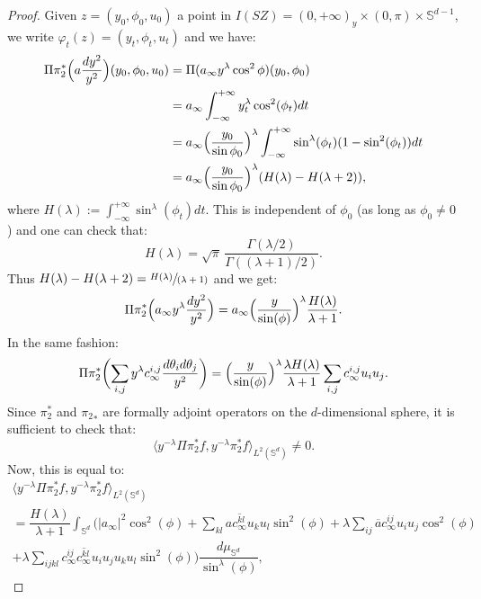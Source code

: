 \documentclass[JEP,XML,SOM,Unicode,NoFloatCountersInSection]{cedram}
\newcommand{\spfrac}[2]{\sfrac{#1}{(#2)}}
\newcommand{\Ss}{\mathbb{S}}
\theoremstyle{plain}
\theoremstyle{definition}
\begin{document}
\begin{proof}
Given $z=(y_0,\phi_0,u_0)$ a point in $I(SZ) = (0,+\infty)_y \times (0,\pi) \times \Ss^{d-1}$, we write $\varphi_t(z)=(y_t,\phi_t,u_t)$ and we have:
\[
\begin{split}
\Pi \pi^*_2 \Bigl(a \dfrac{dy^2}{y^2}\Bigr)(y_0,\phi_0,u_0) & = \Pi(a_\infty y^\lambda \cos^2 \phi)(y_0,\phi_0) \\
& = a_\infty \int_{-\infty}^{+\infty} y_t^\lambda \cos^2(\phi_t) dt \\
& = a_\infty \Bigl(\dfrac{y_0}{\sin \phi_0}\Bigr)^\lambda \int_{-\infty}^{+\infty} \sin^\lambda(\phi_t)(1-\sin^2(\phi_t)) dt \\
& = a_\infty \Bigl(\dfrac{y_0}{\sin \phi_0}\Bigr)^\lambda (H(\lambda)-H(\lambda+2)),
\end{split}
\]
where $H(\lambda) := \int_{-\infty}^{+\infty} \sin^\lambda(\phi_t) dt$. This is independent of $\phi_0$ (as long as $\phi_0 \neq 0$) and one can check that:
\begin{equation}
H(\lambda) = \sqrt{\pi}\,\dfrac{\Gamma(\lambda/2)}{\Gamma((\lambda+1)/2)}.
\end{equation}
Thus $H(\lambda)-H(\lambda+2) = \spfrac{H(\lambda)}{\lambda+1}$ and we get:
\begin{equation}
\Pi \pi_2^*\Bigl(a_\infty y^\lambda \dfrac{dy^2}{y^2}\Bigr) = a_\infty \Bigl(\dfrac{y}{\sin(\phi)}\Bigr)^\lambda \dfrac{H(\lambda)}{\lambda+1}.
\end{equation}
In the same fashion:
\begin{equation}
\Pi \pi_2^*\biggl(\sum_{i,j} y^\lambda c^{i,j}_\infty \dfrac{d\theta_i d\theta_j}{y^2}\biggr) = \Bigl(\dfrac{y}{\sin(\phi)}\Bigr)^\lambda \dfrac{\lambda H(\lambda)}{\lambda+1} \sum_{i,j} c_\infty^{i,j} u_i u_j.
\end{equation}
Since $\pi_2^*$ and ${\pi_2}_*$ are formally adjoint operators on the $d$-dimensional sphere, it is sufficient to check that:
\[ \langle y^{-\lambda} \Pi \pi_2^\ast f,y^{-\lambda}\pi_2^\ast f \rangle_{L^2(\Ss^d)} \neq 0. \]
Now, this is equal to:\vspace*{-5pt}
\begin{multline*}
\langle y^{-\lambda} \Pi \pi_2^\ast f,y^{-\lambda}\pi_2^\ast f \rangle_{L^2(\Ss^d)} \\
= \dfrac{H(\lambda)}{\lambda+1} \int_{\Ss^d} \biggl(|a_\infty|^2 \cos^2(\phi) + \sum_{kl} a \overline{c^{kl}_\infty} u_k u_l \sin^2(\phi) + \lambda \sum_{ij} \overline{a} c^{ij}_\infty u_i u_j \cos^2(\phi)\\[-5pt]
+\lambda \sum_{ijkl} c^{ij}_\infty\overline{c^{kl}_\infty}u_iu_ju_ku_l \sin^2(\phi)\biggr) \dfrac{d\mu_{\Ss^d}}{\sin^\lambda(\phi)},

\end{multline*}
\end{proof}
\end{document}
